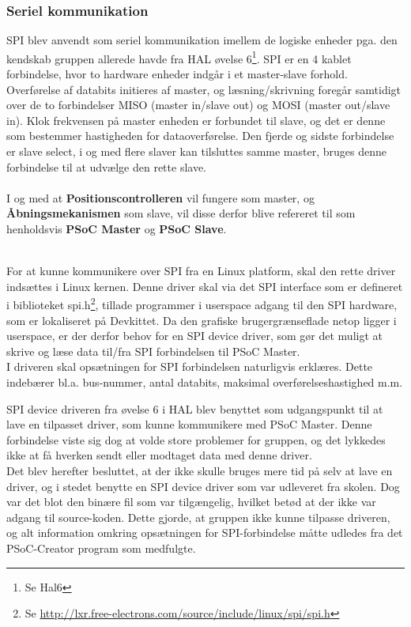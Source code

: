 \subsubsection{Seriel kommunikation}
\label{sub:SPI}
SPI blev anvendt som seriel kommunikation imellem de logiske enheder pga. den kendskab gruppen allerede havde fra HAL øvelse 6\footnote{Se Hal6}. SPI er en 4 kablet
forbindelse, hvor to hardware enheder indgår i et master-slave forhold. Overførelse af databits initieres af master, og læsning/skrivning foregår samtidigt 
over de to forbindelser MISO (master in/slave out) og MOSI (master out/slave in). Klok frekvensen på master enheden er forbundet til slave, og det er denne 
som bestemmer hastigheden for dataoverførelse. Den fjerde og sidste forbindelse er slave select, i og med flere slaver kan tilsluttes samme master, bruges 
denne forbindelse til at udvælge den rette slave. \\
\\
I og med at \textbf{Positionscontrolleren} vil fungere som master, og \textbf{Åbningsmekanismen} som slave, vil disse derfor blive refereret til som henholdsvis \textbf{PSoC Master} og \textbf{PSoC Slave}.

\\ 
For at kunne kommunikere over SPI fra en Linux platform, skal den rette driver indsættes i Linux kernen. Denne driver skal via det SPI interface som
er defineret i biblioteket spi.h\footnote{Se \url{http://lxr.free-electrons.com/source/include/linux/spi/spi.h}}, tillade programmer i userspace adgang til den SPI hardware, som er lokaliseret på Devkittet. Da den grafiske brugergrænseflade
netop ligger i userspace, er der derfor behov for en SPI device driver, som gør det muligt at skrive og læse data til/fra SPI forbindelsen til PSoC Master.\\

I driveren skal opsætningen for SPI forbindelsen naturligvis erklæres. Dette indebærer bl.a. bus-nummer, antal databits, maksimal overførelseshastighed m.m.  
 
SPI device driveren fra øvelse 6 i HAL blev benyttet som udgangspunkt til at lave en tilpasset driver, som kunne kommunikere med PSoC Master. 
Denne forbindelse viste sig dog at volde store problemer for gruppen, og det lykkedes ikke at få hverken sendt eller modtaget data med denne driver.\\

Det blev herefter besluttet, at der ikke skulle bruges mere tid på selv at lave en driver, og i stedet benytte en SPI device driver som var udleveret fra skolen.
Dog var det blot den binære fil som var tilgængelig, hvilket betød at der ikke var adgang til source-koden. Dette gjorde, at gruppen ikke kunne tilpasse driveren,
og alt information omkring opsætningen for SPI-forbindelse måtte udledes fra det PSoC-Creator program som medfulgte. 

